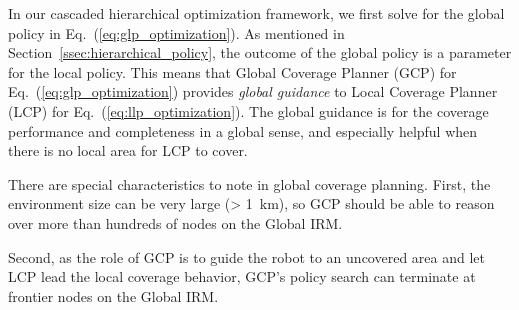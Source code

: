 \documentclass[letterpaper]{article} %
\newcommand{\phdone}[1]{} %
\begin{document}
\phdone{GCP Functionality}
In our cascaded hierarchical optimization framework, we first solve for the global policy in Eq.~(\ref{eq:glp_optimization}).
As mentioned in Section~\ref{ssec:hierarchical_policy}, the outcome of the global policy is a parameter for the local policy.
This means that Global Coverage Planner (GCP) for Eq.~(\ref{eq:glp_optimization}) provides \textit{global guidance} to Local Coverage Planner (LCP) for Eq.~(\ref{eq:llp_optimization}).
The global guidance is for the coverage performance and completeness in a global sense, and especially helpful when there is no local area for LCP to cover.

\phdone{GCP Problem Characteristics--Large-scale}
There are special characteristics to note in global coverage planning. 
First, the environment size can be very large (> 1~km), so GCP should be able to reason over more than hundreds of nodes on the Global IRM.
%
%
\phdone{GCP Problem Characteristics--Frontiers as terminal nodes}
Second, as the role of GCP is to guide the robot to an uncovered area and let LCP lead the local coverage behavior, GCP's policy search can terminate at frontier nodes on the Global IRM.
%
%
%
\end{document}
